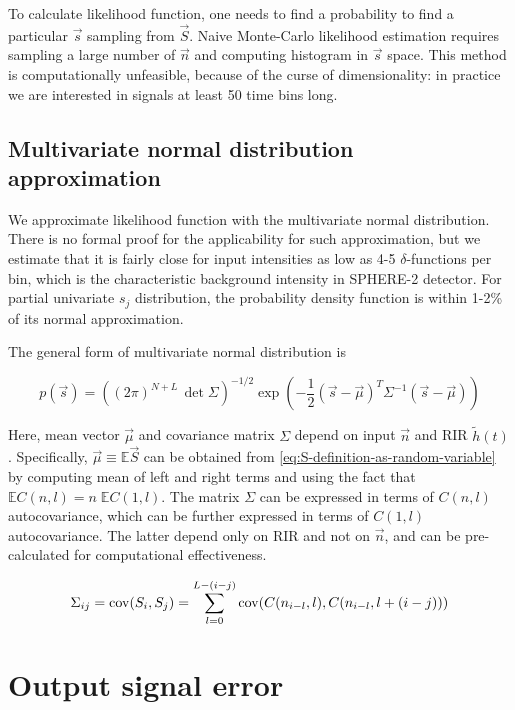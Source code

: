 To calculate likelihood function, one needs to find a probability to find a particular $\vec{s}$ sampling from $\vec{S}$. Naive Monte-Carlo likelihood estimation requires sampling a large number of $\vec{n}$ and computing histogram in $\vec{s}$ space. This method is computationally unfeasible, because of the curse of dimensionality: in practice we are interested in signals at least 50 time bins long.

\subsection{Multivariate normal distribution approximation}
\label{sec:likelihood-as-multivar-normal}

We approximate likelihood function with the multivariate normal distribution. There is no formal proof for the applicability for such approximation, but we estimate that it is fairly close for input intensities as low as 4-5 $\delta$-functions per bin, which is the characteristic background intensity in SPHERE-2 detector. For partial univariate $s_j$ distribution, the probability density function is within 1-2\% of its normal approximation.

The general form of multivariate normal distribution is

\begin{equation}
	\label{eq:multivariate-normal-density}
	p(\vec{s}) = \left( (2 \pi)^{N+L} \, \det \Sigma \right)^{-1/2} \exp \left( - \frac{1}{2} (\vec{s} - \vec{\mu})^T \Sigma^{-1} (\vec{s} - \vec{\mu}) \right)
\end{equation}

Here, mean vector $\vec{\mu}$ and covariance matrix $\Sigma$ depend on input $\vec{n}$ and RIR $\tilde{h}(t)$. Specifically, $\vec{\mu} \equiv \mathbb{E} \vec{S}$ can be obtained from \ref{eq:S-definition-as-random-variable} by computing mean of left and right terms and using the fact that $\mathbb{E} C(n, l) = n \; \mathbb{E} C(1, l)$. The matrix $\Sigma$ can be expressed in terms of $C(n, l)$ autocovariance, which can be further expressed in terms of $C(1, l)$ autocovariance. The latter depend only on RIR and not on $\vec{n}$, and can be pre-calculated for computational effectiveness.

\begin{equation}
	\Sigma_{ij} = \mathrm{cov}(S_i, S_j) = \sum_{l=0}^{L - (i-j)} \mathrm{cov}(C(n_{i-l}, l), C(n_{i-l}, l + (i-j)))
\end{equation}


\section{Output signal error}


